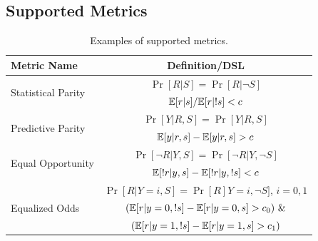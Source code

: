 \begin{subappendices}
\section{Supported Metrics}
\label{sec:appendix:additional-metrics}
\begin{table}
    \centering
    \small
    \begin{tabular}{lc}
    \toprule
        Metric Name  & Definition/DSL  \\
    \midrule 
      \multirow{2}{*}{Statistical Parity \citep{dwork2012fairness}} & $\Pr[R|S] = \Pr[R|\neg S]$ \\ 
      \cmidrule{2-2}
      & $\mathbb{E}[r|s] / \mathbb{E}[r|!s] < c$ \\
      \midrule
       \multirow{2}{*}{Predictive Parity \citep{chouldechova2017fair}} & $\Pr[Y|R, S] = \Pr[Y|R, S]$ \\ 
       \cmidrule{2-2}
       & $\mathbb{E}[y|r, s] - \mathbb{E}[y|r, s] > c$ \\
       \midrule
       \multirow{2}{*}{Equal Opportunity \citep{hardt2016equality}} & $\Pr[\neg R|Y, S] = \Pr[\neg R|Y, \neg S]$ \\ 
       \cmidrule{2-2}
       & $\mathbb{E}[!r|y, s] - \mathbb{E}[!r|y,!s] < c$ \\
       \midrule
       \multirow{3}{*}{Equalized Odds \citep{hardt2016equality}} & $\Pr[R|Y=i, S] = \Pr[R]Y=i, \neg S]$, $i=0, 1$ \\ 
       \cmidrule{2-2}
       & $(\mathbb{E}[r|y=0, !s] - \mathbb{E}[r|y=0, s] > c_0)\ \&$ \\
       & $(\mathbb{E}[r|y=1, !s] - \mathbb{E}[r|y=1, s] > c_1)$ \\   
    \bottomrule
    \end{tabular}
    \caption{Examples of supported metrics.}
    \label{tab:appendix:supported-metrics}
\end{table}


\end{subappendices}
